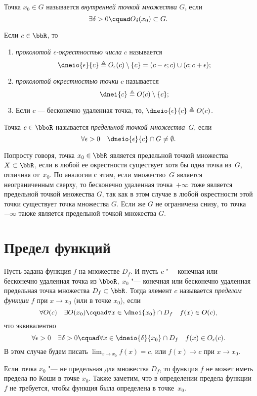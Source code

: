 \begin{defn}
Точка $x_0 \in G$ называется \textit{внутренней точкой множества} $G$, если 
$$
\exists \delta >0\cquad O_\delta(x_0) \subset G.
$$
\end{defn}

\begin{defn}
Если $c \in \bbR$, то 
\begin{enumerate}[wide, labelwidth=!, labelindent=0pt, nolistsep]
\item
\textit{проколотой $\epsilon$-окрестностью числа} $c$ называется 
$$
\dneio{\epsilon}{c} \triangleq O_\epsilon(c)\setminus\{c\}=(c-\epsilon;c)\cup(c;c+\epsilon);
$$
\item
\textit{проколотой окрестностью точки} $c$ называется $$\dnei{c} \triangleq O(c)\setminus \{c\};$$
\item[\textbullet]
Если $c$ --- бесконечно удаленная точка, то, $\dneio{\epsilon}{c}\triangleq O (c) $.
\end{enumerate}
\end{defn}

\begin{defn}
Точка $c \in \bboR$ называется \textit{предельной точкой множества}~$G$, если $$\forall \epsilon >0 \quad \dneio{\epsilon}{c} \cap G \ne \emptyset.$$
\end{defn}
Попросту говоря, точка $x_0 \in \bbR$ является предельной точкой множества~$X \subset \bbR$, если в любой ее окрестности существует хотя бы одна точка из~$G$, отличная от~$x_0$. По аналогии с этим, если множество~$G$ является неограниченным сверху, то бесконечно удаленная точка~$+\infty$ тоже является предельной точкой множества $G$, так как в этом случае в любой окрестности этой точки существует точка множества $G$. Если же $G$ не ограничена снизу, то точка $-\infty$ также является предельной точкой множества $G$.

\section{Предел функций}
\begin{defn}\label{df:ch2:predelCaushi}
Пусть задана функция $f$ на множестве $D_f$. И пусть $c$ "--- конечная или бесконечно удаленная точка из $\bboR$, $x_0$ "--- конечная или бесконечно удаленная предельная точка  множества $D_f \subset \bbR$. Тогда элемент $c$ называется \textit{пределом функции} $f$ при $x \to x_0$ (или в точке $x_0$), если
$$
\forall O(c)\quad \exists O(x_0)\cquad \forall x \in \dnei{x_0}\cap D_f\quad f(x) \in O(c),
$$  
что эквивалентно
$$
\forall \epsilon > 0\quad \exists \delta >0\cquad \forall x \in \dneio{\delta}{x_0} \cap D_f\quad f(x) \in O_\epsilon (c). 
$$
В этом случае будем писать $\lim_{x \to x_0}\limits f(x) = c$, или $f(x)\to c$ при $x \to x_0$.
\end{defn}
Если точка $x_0$ "--- не предельная для множества $D_f$, то функция $f$ не может иметь предела по Коши в точке $x_0$. Также заметим, что в определении предела функции $f$ не требуется, чтобы функция была определена в точке~$x_0$.

